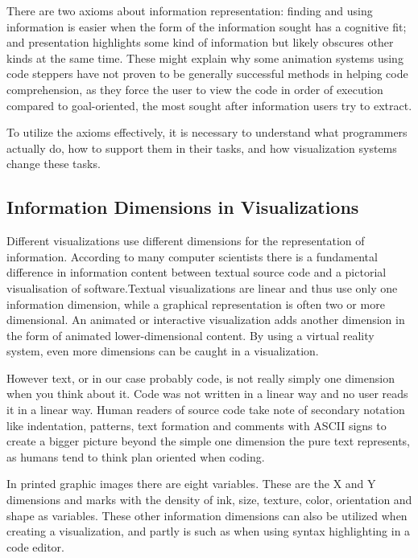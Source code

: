 \documentclass[11pt, a4paper, ngerman, twoside]{article}
\theoremstyle{plain}\newtheorem{Lemma}{Lemma}
\theoremstyle{plain}\newtheorem{Satz}[Lemma]{Satz}
\theoremstyle{definition}\newtheorem{Definition}[Lemma]{Definition}
\theoremstyle{definition}\newtheorem*{Beispiel}{Beispiel}
\theoremstyle{remark}\newtheorem*{Bemerkung}{Bemerkung}
\begin{document}
There are two axioms about information representation: finding and using information is easier when the form of the information sought has a cognitive fit; and presentation highlights some kind of information but likely obscures other kinds at the same time. These might explain why some animation systems using code steppers have not proven to be generally successful methods in helping code comprehension, as they force the user to view the code in order of execution compared to goal-oriented, the most sought after information users try to extract.

To utilize the axioms effectively, it is necessary to understand what programmers actually do, how to support them in their tasks, and how visualization systems change these tasks.

\subsection{Information Dimensions in Visualizations}

Different visualizations use different dimensions for the representation of information. According to many computer scientists there is a fundamental difference in information content between textual source code and a pictorial visualisation of software\cite{blackwell}.Textual visualizations are linear and thus use only one information dimension, while a graphical representation is often two or more dimensional. An animated or interactive visualization adds another dimension in the form of animated lower-dimensional content. By using a virtual reality system, even more dimensions can be caught in a visualization.

However text, or in our case probably code, is not really simply one dimension when you think about it. Code was not written in a linear way and no user reads it in a linear way. Human readers of source code take note of secondary notation \cite{green} like indentation, patterns, text formation and comments with ASCII signs to create a bigger picture beyond the simple one dimension the pure text represents, as humans tend to think plan oriented when coding.

In printed graphic images there are eight variables\cite{bertin}. These are the X and Y dimensions and marks with the density of ink, size, texture, color, orientation and shape as variables. These other information dimensions can also be utilized when creating a visualization, and partly is such as when using syntax highlighting in a code editor.
\end{document}
